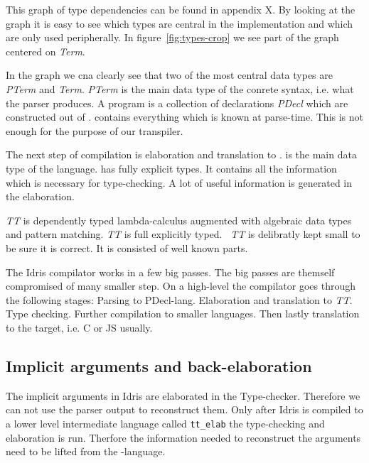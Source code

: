 This graph of type dependencies can be found in appendix X. By looking at the
graph it is easy to see which types are central in the implementation and which
are only used peripherally. In figure~\ref{fig:types-crop} we see part of the
graph centered on \textit{Term}.

In the graph we cna clearly see that two of the most central data types are
\textit{PTerm} and \textit{Term}. \textit{PTerm} is the main data type of the
conrete syntax, i.e. what the parser produces. A program is a collection of
declarations \textit{PDecl} which are constructed out of \pterm. \pterm
contains everything which is known at parse-time. This is not enough for the
purpose of our transpiler.

The next step of compilation is elaboration and translation to \tti. \term is
the main data type of the \tti language. \tti has fully explicit types. It
contains all the information which is necessary for type-checking. A lot of
useful information is generated in the elaboration.

\textit{TT} is dependently typed lambda-calculus augmented with algebraic data
types and pattern matching. \textit{TT} is full explicitly typed.~\cite{idris}
\textit{TT} is delibratly kept small to be sure it is correct. It is consisted
of well known parts.

The Idris compilator works in a few big passes. The big passes are themself
compromised of many smaller step. On a high-level the compilator goes through
the following stages: Parsing to PDecl-lang. Elaboration and translation to
\textit{TT}. Type checking. Further compilation to smaller languages. Then
lastly translation to the target, i.e. C or JS usually.

\subsection{Implicit arguments and back-elaboration}
The implicit arguments in Idris are elaborated in the Type-checker. Therefore
we can not use the parser output to reconstruct them.  Only after Idris is
compiled to a lower level intermediate language called \texttt{tt\_elab} the
type-checking and elaboration is run. Therfore the information needed to
reconstruct the arguments need to be lifted from the \tti-language.

